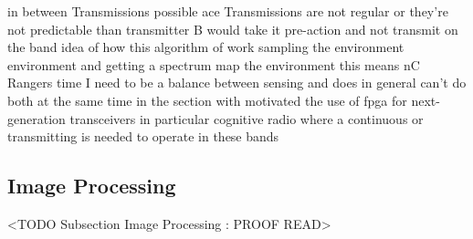in between Transmissions possible ace Transmissions are not regular or they're not predictable than transmitter B would take it pre-action and not transmit on the band idea of how this algorithm of work sampling the environment environment and getting a spectrum map the environment this means nC Rangers time I need to be a balance between sensing and does in general can't do both at the same time in the section with motivated the use of fpga for next-generation transceivers in particular cognitive radio where a continuous or transmitting is needed to operate in these bands

\subsection{Image Processing}
	<TODO Subsection Image Processing : PROOF READ>

